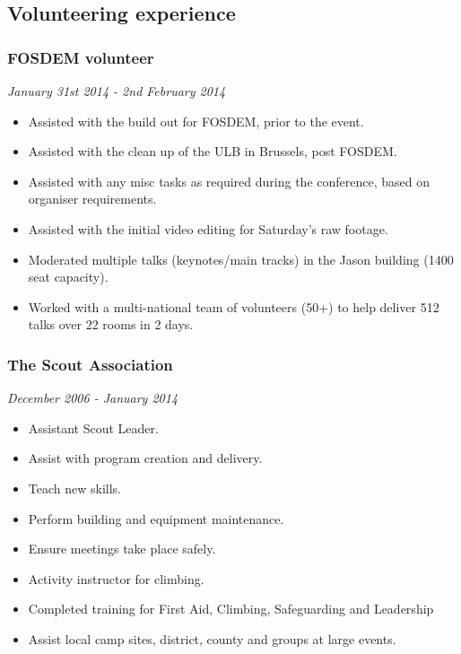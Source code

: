 \subsection{Volunteering experience}

\subsubsection{FOSDEM volunteer}

\emph{January 31st 2014 - 2nd February 2014}

\begin{itemize}
\item
  Assisted with the build out for FOSDEM, prior to the event.
\item
  Assisted with the clean up of the ULB in Brussels, post FOSDEM.
\item
  Assisted with any misc tasks as required during the conference, based
  on organiser requirements.
\item
  Assisted with the initial video editing for Saturday's raw footage.
\item
  Moderated multiple talks (keynotes/main tracks) in the Jason building
  (1400 seat capacity).
\item
  Worked with a multi-national team of volunteers (50+) to help deliver
  512 talks over 22 rooms in 2 days.
\end{itemize}

\subsubsection{The Scout Association}

\emph{December 2006 - January 2014}

\begin{itemize}
\item
  Assistant Scout Leader.
\item
  Assist with program creation and delivery.
\item
  Teach new skills.
\item
  Perform building and equipment maintenance.
\item
  Ensure meetings take place safely.
\item
  Activity instructor for climbing.
\item
  Completed training for First Aid, Climbing, Safeguarding and
  Leadership
\item
  Assist local camp sites, district, county and groups at large events.
\end{itemize}

